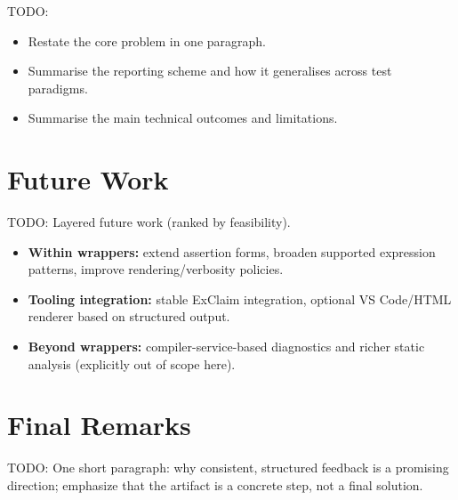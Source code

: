 \documentclass[
	bibliography=totoc,
	listof=totoc,
]{scrbook}
\begin{document}
\begin{marker}\begin{justify}
TODO:
\begin{itemize}
    \item Restate the core problem in one paragraph.
    \item Summarise the reporting scheme and how it generalises across test paradigms.
    \item Summarise the main technical outcomes and limitations.
\end{itemize}
\end{justify}\end{marker}


\section{Future Work} %

\begin{marker}\begin{justify}
TODO: Layered future work (ranked by feasibility).
\begin{itemize}
    \item \textbf{Within wrappers:} extend assertion forms, broaden supported expression patterns, improve rendering/verbosity policies.
    \item \textbf{Tooling integration:} stable ExClaim integration, optional VS Code/HTML renderer based on structured output.
    \item \textbf{Beyond wrappers:} compiler-service-based diagnostics and richer static analysis (explicitly out of scope here).
\end{itemize}
\end{justify}\end{marker}


\section{Final Remarks} %

\begin{marker}\begin{justify}
TODO: One short paragraph: why consistent, structured feedback is a promising direction; emphasize that the artifact is a concrete step, not a final solution.
\end{justify}\end{marker}


\end{document}
